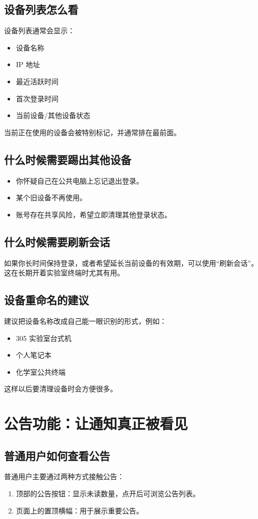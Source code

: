 \documentclass[12pt,a4paper]{ctexart}
\begin{document}
\subsection{设备列表怎么看}
设备列表通常会显示：
\begin{itemize}
  \item 设备名称
  \item IP 地址
  \item 最近活跃时间
  \item 首次登录时间
  \item 当前设备/其他设备状态
\end{itemize}

当前正在使用的设备会被特别标记，并通常排在最前面。

\subsection{什么时候需要踢出其他设备}
\begin{itemize}
  \item 你怀疑自己在公共电脑上忘记退出登录。
  \item 某个旧设备不再使用。
  \item 账号存在共享风险，希望立即清理其他登录状态。
\end{itemize}

\subsection{什么时候需要刷新会话}
如果你长时间保持登录，或者希望延长当前设备的有效期，可以使用“刷新会话”。这在长期开着实验室终端时尤其有用。

\subsection{设备重命名的建议}
建议把设备名称改成自己能一眼识别的形式，例如：
\begin{itemize}
  \item 305 实验室台式机
  \item 个人笔记本
  \item 化学室公共终端
\end{itemize}

这样以后要清理设备时会方便很多。

\newpage
\section{公告功能：让通知真正被看见}

\subsection{普通用户如何查看公告}
普通用户主要通过两种方式接触公告：
\begin{enumerate}
  \item 顶部的公告按钮：显示未读数量，点开后可浏览公告列表。
  \item 页面上的置顶横幅：用于展示重要公告。
\end{enumerate}
\end{document}
